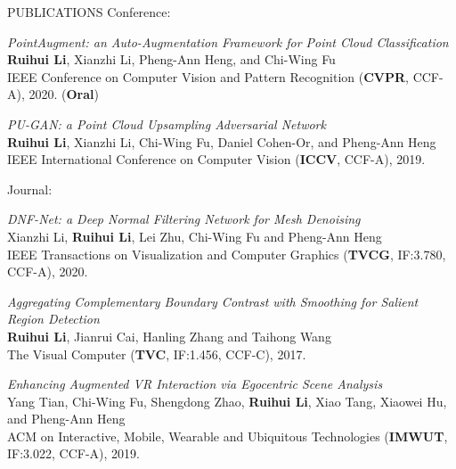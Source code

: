 \documentclass[UTF8]{cv} %
\begin{document}
\begin{rSection}{PUBLICATIONS}
\hspace{-7mm} Conference:

\begin{etaremune}[itemindent=0.00em]
    \renewcommand\labelenumi{[C\theenumi]}
    \item  \emph{PointAugment: an Auto-Augmentation Framework for Point Cloud Classification}
\\    \textbf{Ruihui Li}, Xianzhi Li, Pheng-Ann Heng, and Chi-Wing Fu
\\    IEEE Conference on Computer Vision and Pattern Recognition (\textbf{CVPR}, CCF-A), 2020. (\textbf{Oral})
    \item  \emph{PU-GAN: a Point Cloud Upsampling Adversarial Network}
\\    \textbf{Ruihui Li}, Xianzhi Li, Chi-Wing Fu, Daniel Cohen-Or, and Pheng-Ann Heng
\\    IEEE International Conference on Computer Vision (\textbf{ICCV}, CCF-A), 2019.
 
\end{etaremune}


\hspace{-7mm} Journal:

\begin{etaremune}[itemindent=0.00em]
    \renewcommand\labelenumi{[J\theenumi]}
    \item  \emph{DNF-Net: a Deep Normal Filtering Network for Mesh Denoising}
\\    Xianzhi Li, \textbf{Ruihui Li}, Lei Zhu, Chi-Wing Fu and Pheng-Ann Heng
\\    IEEE Transactions on Visualization and Computer Graphics  (\textbf{TVCG}, IF:3.780, CCF-A), 2020.
    \item  \emph{Aggregating Complementary Boundary Contrast with Smoothing for Salient Region Detection}
\\    \textbf{Ruihui Li}, Jianrui Cai, Hanling Zhang and Taihong Wang
\\    The Visual Computer (\textbf{TVC}, IF:1.456, CCF-C), 2017.
    \item \emph{Enhancing Augmented VR Interaction via Egocentric Scene Analysis}
\\  Yang Tian, Chi-Wing Fu, Shengdong Zhao, \textbf{Ruihui Li}, Xiao Tang, Xiaowei Hu, and Pheng-Ann Heng
\\ACM on Interactive, Mobile, Wearable and Ubiquitous Technologies (\textbf{IMWUT}, IF:3.022, CCF-A), 2019.
\end{etaremune}


\end{rSection}
\end{document}
